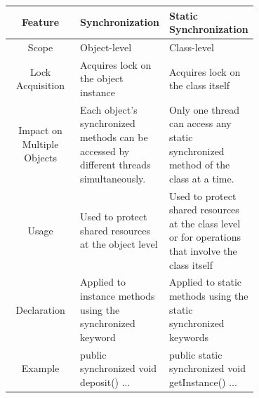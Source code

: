 \documentclass[12pt, a4paper]{book}
\begin{document}
\begin{tabular}{c|p{0.35\linewidth}|p{0.35\linewidth}}
    Feature                    & \textbf{Synchronization}                                                                & \textbf{Static Synchronization}                                                                     \\
    \hline
    Scope                      & Object-level                                                                            & Class-level                                                                                         \\
    \hline
    Lock Acquisition           & Acquires lock on the object instance                                                    & Acquires lock on the class itself                                                                   \\
    \hline
    Impact on Multiple Objects & Each object's synchronized methods can be accessed by different threads simultaneously. & Only one thread can access any static synchronized method of the class at a time.                   \\
    \hline
    Usage                      & Used to protect shared resources at the object level                                    & Used to protect shared resources at the class level or for operations that involve the class itself \\
    \hline
    Declaration                & Applied to instance methods using the synchronized keyword                              & Applied to static methods using the static synchronized keywords                                    \\
    \hline
    Example                    & public synchronized void deposit() { ... }                                              & public static synchronized void getInstance() { ... }                                               \\
\end{tabular}
\end{document}
